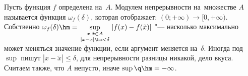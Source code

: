 
 Пусть функция $f$ определена на~$A$. Модулем непрерывности на~множестве $A$ называется функция 
 $\omega_f(\delta)$, которая отображает: $(0;+\infty)\to[0,+\infty)$. Собственно $\omega_f(\delta)\hm=
 \sup\limits_{\begin{smallmatrix}x,\tilde x\in A\\|x-\tilde x|\hm<\delta\end{smallmatrix}}|f(x)-f(\tilde x)|$ 
 "--- насколько максимально может меняться значение функции, если аргумент меняется на~$\delta$.
 Иногда под~$\sup$ пишут $|x-\tilde x|\leq\delta$, для непрерывности разницы никакой, дело вкуса. 
 Считаем также, что $A$ непусто, иначе $\sup \q\hm=-\infty$.
 